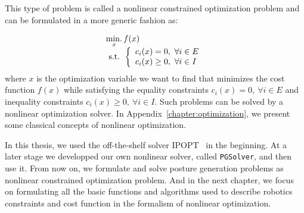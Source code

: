 This type of problem is called a nonlinear constrained optimization problem and can be formulated in a more generic fashion as:

\begin{equation}
\label{eq:optim_form_PG}
  \begin{array}{l}
    \operatorname*{min.}\limits_{x}{f(x)}\\
    \text{ s.t. }
    \left\{
    \begin{array}{l}
      c_i(x) = 0,\ \forall i\in{E}\\
      c_i(x) \geq 0,\ \forall i\in{I}\\
    \end{array}
    \right.
  \end{array}
\end{equation}
where $x$ is the optimization variable we want to find that minimizes the cost function $f(x)$ while satisfying the equality constraints $c_i(x) = 0,\ \forall i\in{E}$ and inequality constraints $c_i(x) \geq 0,\ \forall i\in{I}$.
Such problems can be solved by a nonlinear optimization solver.
In Appendix~\ref{chapter:optimization}, we present some classical concepts of nonlinear optimization.

In this thesis, we used the off-the-shelf solver IPOPT~\cite{wachter:mathprog:2006} in the beginning. At a later stage we developped our own nonlinear solver, called {\tt PGSolver}, and then use it.
From now on, we formulate and solve posture generation problems as nonlinear constrained optimization problem.
And in the next chapter, we focus on formulating all the basic functions and algorithms used to describe robotics constraints and cost function in the formalism of nonlinear optimization.

